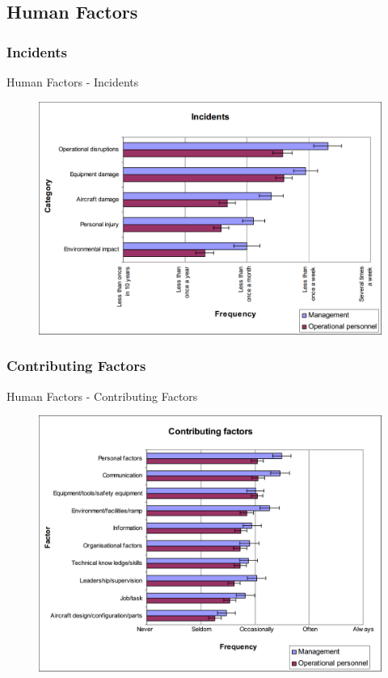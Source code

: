 \subsection{Human Factors}

\subsubsection{Incidents}
\begin{frame}{Human Factors - Incidents}{}
	\begin{figure}[H]
	\centering
	\includegraphics[width=\textwidth]{Grafik/FrequencyOfIncidents}
\end{figure}
\end{frame}

\subsubsection{Contributing Factors}
\begin{frame}{Human Factors - Contributing Factors}{}
	\begin{figure}[H]
	\centering
	\includegraphics[width=\textwidth]{Grafik/ContributingFactors}
\end{figure}
\end{frame}

